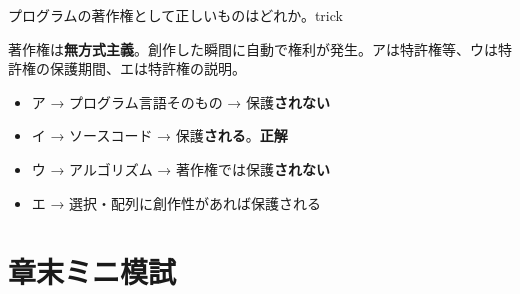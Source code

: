 \begin{mondai}{プログラムの著作権として正しいものはどれか。}{trick}
\end{mondai}

\kaitoupage

\begin{kaisetsu}
著作権は\textbf{無方式主義}。創作した瞬間に自動で権利が発生。アは特許権等、ウは特許権の保護期間、エは特許権の説明。
\end{kaisetsu}

\begin{goutoubun}
\begin{itemize}
  \item ア → プログラム言語そのもの → 保護\textbf{されない}
  \item イ → ソースコード → 保護\textbf{される}。\textbf{正解}
  \item ウ → アルゴリズム → 著作権では保護\textbf{されない}
  \item エ → 選択・配列に創作性があれば保護される
\end{itemize}
\end{goutoubun}


\section*{章末ミニ模試}

